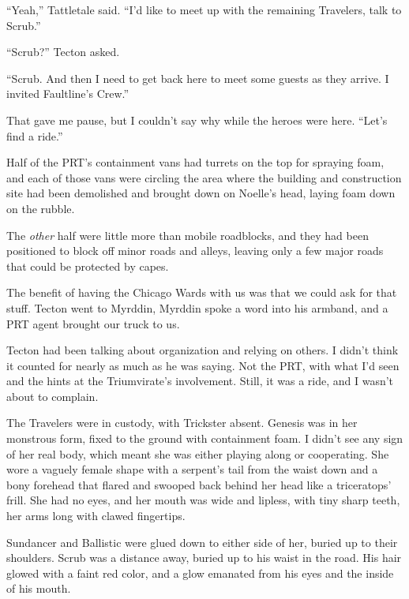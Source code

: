 ``Yeah,'' Tattletale said.  ``I'd like to meet up with the remaining Travelers, talk to Scrub.''



``Scrub?'' Tecton asked.



``Scrub.  And then I need to get back here to meet some guests as they arrive.  I invited Faultline's Crew.''



That gave me pause, but I couldn't say why while the heroes were here.  ``Let's find a ride.''



Half of the PRT's containment vans had turrets on the top for spraying foam, and each of those vans were circling the area where the building and construction site had been demolished and brought down on Noelle's head, laying foam down on the rubble.



The \emph{other} half were little more than mobile roadblocks, and they had been positioned to block off minor roads and alleys, leaving only a few major roads that could be protected by capes.



The benefit of having the Chicago Wards with us was that we could ask for that stuff.  Tecton went to Myrddin, Myrddin spoke a word into his armband, and a PRT agent brought our truck to us.



Tecton had been talking about organization and relying on others.  I didn't think it counted for nearly as much as he was saying.  Not the PRT, with what I'd seen and the hints at the Triumvirate's involvement.  Still, it was a ride, and I wasn't about to complain.



\blacksquare



The Travelers were in custody, with Trickster absent.  Genesis was in her monstrous form, fixed to the ground with containment foam.  I didn't see any sign of her real body, which meant she was either playing along or cooperating.  She wore a vaguely female shape with a serpent's tail from the waist down and a bony forehead that flared and swooped back behind her head like a triceratops' frill.  She had no eyes, and her mouth was wide and lipless, with tiny sharp teeth, her arms long with clawed fingertips.



Sundancer and Ballistic were glued down to either side of her, buried up to their shoulders.  Scrub was a distance away, buried up to his waist in the road.  His hair glowed with a faint red color, and a glow emanated from his eyes and the inside of his mouth.



